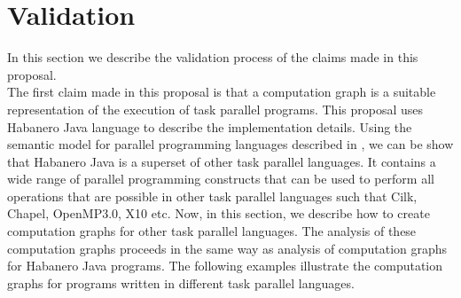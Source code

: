 \section{Validation}

In this section we describe the validation process of the claims made in this proposal.\\

The first claim made in this proposal is that a computation graph is a suitable representation of the execution of task parallel programs. This proposal uses Habanero Java language to describe the implementation details. Using the semantic model for parallel programming languages described in \cite{bouajjani2012analysis}, we can be show that Habanero Java is a superset of other task parallel languages. It contains a wide range of parallel programming constructs that can be used to perform all operations that are possible in other task parallel languages such that Cilk, Chapel, OpenMP3.0, X10 etc. Now, in this section, we describe how to create computation graphs for other task parallel languages. The analysis of these computation graphs proceeds in the same way as analysis of computation graphs for Habanero Java programs. The following examples illustrate the computation graphs for programs written in different task parallel languages.

